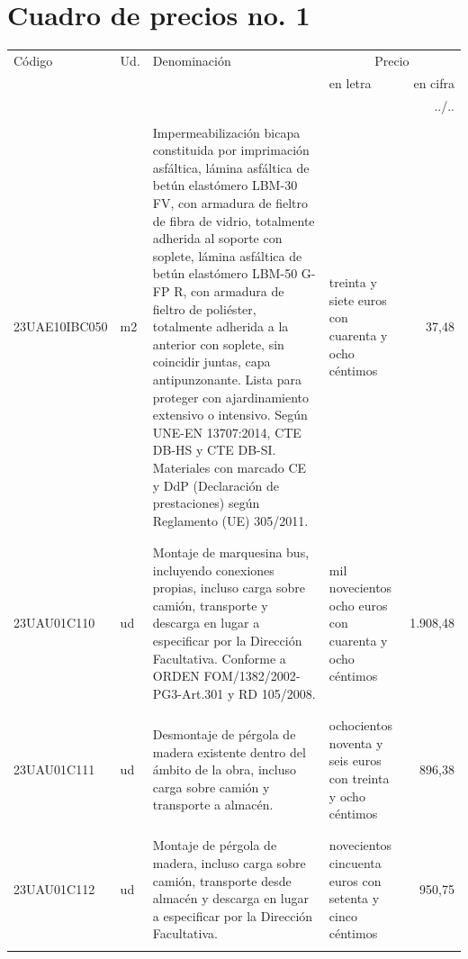 \documentclass{book}%
\begin{document}
\part{Cuadro de precios no. 1}%
\label{sec:Cuadrodepreciosno.1}%
\parttoc%
\setcounter{chapter}{0}%
\small%
\begin{longtable}{|l|l|p{5cm}|p{3cm}|r|}%
\hline%
Código&Ud.&Denominación&\multicolumn{2}{|c|}{Precio}\\%
&&&en letra&en cifra\\%
\hline%
\endhead%
\hline%
\multicolumn{5}{|r|}{../..}\\%
\hline%
\endfoot%
\hline%
\endlastfoot%
&&&&\\%
23UAE10IBC050&m2&Impermeabilización bicapa constituida por imprimación asfáltica, lámina asfáltica de betún elastómero LBM{-}30 FV, con armadura de fieltro de fibra de vidrio, totalmente adherida al soporte con soplete, lámina asfáltica de betún elastómero LBM{-}50 G{-}FP R, con armadura de fieltro de poliéster, totalmente adherida a la anterior con soplete, sin coincidir juntas, capa antipunzonante. Lista para proteger con ajardinamiento extensivo o intensivo. Según UNE{-}EN 13707:2014, CTE DB{-}HS y CTE DB{-}SI. Materiales con marcado CE y DdP (Declaración de prestaciones) según Reglamento (UE) 305/2011.&treinta y siete euros con cuarenta y ocho céntimos&37,48\\%
&&&&\\%
&&&&\\%
23UAU01C110&ud&Montaje de marquesina bus, incluyendo conexiones propias, incluso carga sobre camión, transporte y descarga en lugar a especificar por la Dirección Facultativa. Conforme a ORDEN FOM/1382/2002{-}PG3{-}Art.301 y RD 105/2008.&mil novecientos ocho euros con cuarenta y ocho céntimos&1.908,48\\%
&&&&\\%
&&&&\\%
23UAU01C111&ud&Desmontaje de pérgola de madera existente dentro del ámbito de la obra, incluso carga sobre camión y transporte a almacén.&ochocientos noventa y seis euros con treinta y ocho céntimos&896,38\\%
&&&&\\%
&&&&\\%
23UAU01C112&ud&Montaje de pérgola de madera, incluso carga sobre camión, transporte desde almacén y descarga en lugar a especificar por la Dirección Facultativa.&novecientos cincuenta euros con setenta y cinco céntimos&950,75\\%
&&&&\\%

\end{longtable}
\end{document}
